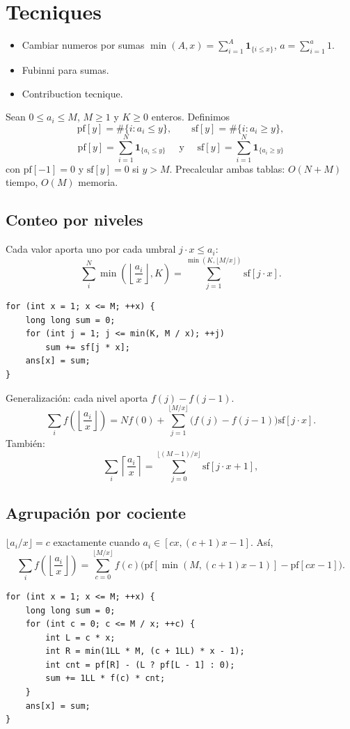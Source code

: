 \section{Tecniques}

\begin{itemize}[noitemsep]
    \item Cambiar numeros por sumas $\min(A,x)= \sum_{i=1}^A \mathbf{1}_{\{i \leq x\}}$, $a= \sum_{i=1}^a 1$.
    \item Fubinni para sumas.
    \item Contribuction tecnique.
\end{itemize}



Sean $0\le a_i\le M$, $M\ge1$ y $K\ge0$ enteros.
Definimos
\[
\text{pf}[y]=\#\{i:a_i\le y\},\qquad
\text{sf}[y]=\#\{i:a_i\ge y\},
\]
$$ \text{pf}[y] = \sum_{i=1}^{N} \mathbf{1}_{\{a_i \leq y\}} \quad \text{ y } \quad \text{sf}[y] = \sum_{i=1}^{N} \mathbf{1}_{\{a_i \ge y\}}$$
con $\text{pf}[-1]=0$ y $\text{sf}[y]=0$ si $y>M$.
Precalcular ambas tablas: $O(N+M)$ tiempo, $O(M)$ memoria.

\subsection{Conteo por niveles}
Cada valor aporta uno por cada umbral $j \cdot x\le a_i$:
\[
\sum_i^N\min\!\left(\left\lfloor\frac{a_i}{x}\right\rfloor,K\right)
=\sum_{j=1}^{\min(K,\lfloor M/x\rfloor)}\text{sf}[j \cdot x].
\]
\begin{verbatim}
for (int x = 1; x <= M; ++x) {
    long long sum = 0;
    for (int j = 1; j <= min(K, M / x); ++j)
        sum += sf[j * x];
    ans[x] = sum;
}
\end{verbatim}

Generalización: cada nivel aporta $f(j)-f(j-1)$.
\[
\sum_i f\!\left(\left\lfloor\frac{a_i}{x}\right\rfloor\right)
=Nf(0)+\sum_{j=1}^{\lfloor M/x\rfloor}
\bigl(f(j)-f(j-1)\bigr)\text{sf}[j \cdot x].
\]
También:
\[
\sum_i\left\lceil\frac{a_i}{x}\right\rceil
=\sum_{j=0}^{\lfloor(M-1)/x\rfloor}\text{sf}[j \cdot x+1],
\]

\subsection{Agrupación por cociente}
$\lfloor a_i/x\rfloor=c$ exactamente cuando
$a_i\in[cx,(c+1)x-1]$. Así,
\[
\sum_i f\!\left(\left\lfloor\frac{a_i}{x}\right\rfloor\right)
=\sum_{c=0}^{\lfloor M/x\rfloor} f(c)
\bigl(\text{pf}[\min(M,(c+1)x-1)]-\text{pf}[cx-1]\bigr).
\]
\begin{verbatim}
for (int x = 1; x <= M; ++x) {
    long long sum = 0;
    for (int c = 0; c <= M / x; ++c) {
        int L = c * x;
        int R = min(1LL * M, (c + 1LL) * x - 1);
        int cnt = pf[R] - (L ? pf[L - 1] : 0);
        sum += 1LL * f(c) * cnt;
    }
    ans[x] = sum;
}
\end{verbatim}

